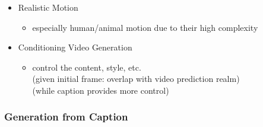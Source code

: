 \begin{itemize}
\begin{itemize}
	\item Realistic Motion
		\begin{itemize}
		\item especially human/animal motion due to their high complexity
		\end{itemize}
	\item Conditioning Video Generation
		\begin{itemize}
		\item control the content, style, etc. \\
		(given initial frame: overlap with video prediction realm) \\
		(while caption provides more control)
		\end{itemize}
	\end{itemize}
\end{itemize}
\subsubsection{Generation from Caption}
